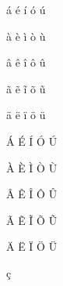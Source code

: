 \documentclass[12pt,a4paper]{article}
\begin{document}
\'a
\'e
\'i
\'o
\'u

\`a
\`e
\`i
\`o
\`u

\^a
\^e
\^i
\^o
\^u

\~a
\~e
\~i
\~o
\~u

\"a
\"e
\"i
\"o
\"u

\'A
\'E
\'I
\'O
\'U

\`A
\`E
\`I
\`O
\`U

\^A
\^E
\^I
\^O
\^U

\~A
\~E
\~I
\~O
\~U

\"A
\"E
\"I
\"O
\"U

\c{c}
\end{document}

